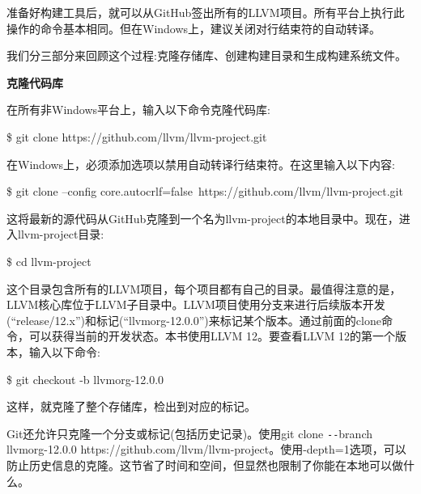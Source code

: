 准备好构建工具后，就可以从GitHub签出所有的LLVM项目。所有平台上执行此操作的命令基本相同。但在Windows上，建议关闭对行结束符的自动转译。\par

我们分三部分来回顾这个过程:克隆存储库、创建构建目录和生成构建系统文件。\par

\hspace*{\fill} \par %
\textbf{克隆代码库}

在所有非Windows平台上，输入以下命令克隆代码库:\par

\begin{tcolorbox}[colback=white,colframe=black]
\$ git clone https://github.com/llvm/llvm-project.git
\end{tcolorbox}

在Windows上，必须添加选项以禁用自动转译行结束符。在这里输入以下内容:\par

\begin{tcolorbox}[colback=white,colframe=black]
\$ git clone --config core.autocrlf=false\ https://github.com/llvm/llvm-project.git
\end{tcolorbox}

这将最新的源代码从GitHub克隆到一个名为llvm-project的本地目录中。现在，进入llvm-project目录:\par

\begin{tcolorbox}[colback=white,colframe=black]
\$ cd llvm-project
\end{tcolorbox}

这个目录包含所有的LLVM项目，每个项目都有自己的目录。最值得注意的是，LLVM核心库位于LLVM子目录中。LLVM项目使用分支来进行后续版本开发(“release/12.x”)和标记(“llvmorg-12.0.0”)来标记某个版本。通过前面的clone命令，可以获得当前的开发状态。本书使用LLVM 12。要查看LLVM 12的第一个版本，输入以下命令:\par

\begin{tcolorbox}[colback=white,colframe=black]
\$ git checkout -b llvmorg-12.0.0
\end{tcolorbox}

这样，就克隆了整个存储库，检出到对应的标记。\par

Git还允许只克隆一个分支或标记(包括历史记录)。使用git clone \verb|--|branch llvmorg-12.0.0 https://github.com/llvm/llvm-project。使用-depth=1选项，可以防止历史信息的克隆。这节省了时间和空间，但显然也限制了你能在本地可以做什么。\par

